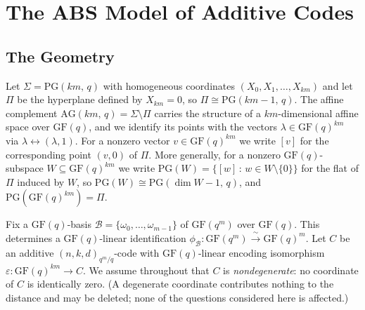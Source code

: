 \documentclass[12pt]{article}
\theoremstyle{definition}
\numberwithin{equation}{section}
\newcommand{\la}{\lambda}
\newcommand{\GF}[1]{\mathrm{GF}(#1)}
\newcommand{\PG}[2]{\mathrm{PG}(#1,\,#2)}
\newcommand{\PGv}[1]{\mathrm{PG}(#1)}
\newcommand{\AG}[2]{\mathrm{AG}(#1,\,#2)}
\begin{document}
\section{The ABS Model of Additive Codes}
\label{sec:ABS}

\subsection*{The Geometry}

Let $\Sigma=\PG{km}{q}$ with homogeneous coordinates $(X_0,X_1,\ldots,X_{km})$ and let $\Pi$ be the hyperplane defined by $X_{km}=0$, so $\Pi\cong\PG{km-1}{q}$.  The affine complement $\AG{km}{q}=\Sigma\setminus\Pi$ carries the structure of a $km$-dimensional affine space over $\GF{q}$, and we identify its points with the vectors $\la\in\GF{q}^{km}$ via $\la\leftrightarrow(\la,1)$.  For a nonzero vector $v\in\GF{q}^{km}$ we write $[v]$ for the corresponding point $(v,0)$ of $\Pi$.  More generally, for a nonzero $\GF{q}$-subspace
$W\subseteq\GF{q}^{km}$ we write $\PGv{W}=\{[w]\,:\,w\in W\setminus\{0\}\}$ for the flat of $\Pi$ induced by $W$, so $\PGv{W}\cong\PG{\dim W-1}{q}$, and $\PGv{\GF{q}^{km}}=\Pi$.

Fix a $\GF{q}$-basis $\mathcal{B}=\{\omega_0,\ldots,\omega_{m-1}\}$ of $\GF{q^m}$ over $\GF{q}$. This determines a $\GF{q}$-linear identification $\phi_{\mathcal{B}}:\GF{q^m}\xrightarrow{\;\sim\;}\GF{q}^m$.
Let $C$ be an additive $(n,k,d)_{q^m/q}$-code with $\GF{q}$-linear encoding isomorphism $\varepsilon:\GF{q}^{km}\to C$.  We assume throughout that $C$ is \textit{nondegenerate}: no coordinate of $C$ is identically zero.  (A degenerate coordinate contributes nothing to the distance and may be deleted; none of the questions considered here is affected.)
\end{document}
